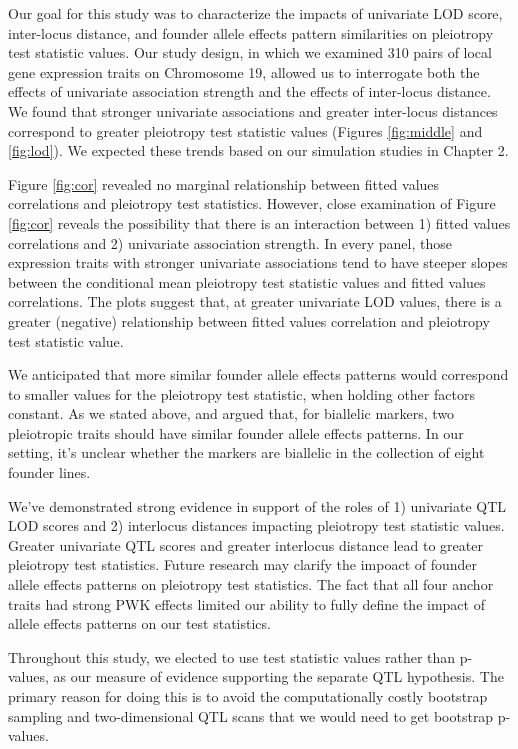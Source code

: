 \documentclass[oneside]{book}
\begin{document}
Our goal for this study was to characterize the impacts of univariate LOD score, inter-locus distance, and founder allele effects pattern similarities on pleiotropy test statistic values. Our study design, in which we examined 310 pairs of local gene expression traits on Chromosome 19, allowed us to interrogate both the effects of univariate association strength and the effects of inter-locus distance. We found that stronger univariate associations and greater inter-locus distances correspond to greater pleiotropy test statistic values (Figures \ref{fig:middle} and \ref{fig:lod}). We expected these trends based on our simulation studies in Chapter 2.

Figure \ref{fig:cor} revealed no marginal relationship between fitted values correlations and pleiotropy test statistics. However, close examination of Figure \ref{fig:cor} reveals the possibility that there is an interaction between 1) fitted values correlations and 2) univariate association strength. In every panel, those expression traits with stronger univariate associations tend to have steeper slopes between the conditional mean pleiotropy test statistic values and fitted values correlations. The plots suggest that, at greater univariate LOD values, there is a greater (negative) relationship between fitted values correlation and pleiotropy test statistic value.

We anticipated that more similar founder allele effects patterns would correspond to smaller values for the pleiotropy test statistic, when holding other factors constant. As we stated above, \citet{macdonald2007joint} and \citet{king2012genetic} argued that, for biallelic markers, two pleiotropic traits should have similar founder allele effects patterns. In our setting, it's unclear whether the markers are biallelic in the collection of eight founder lines.

We've demonstrated strong evidence in support of the roles of 1) univariate QTL LOD scores and 2) interlocus distances impacting pleiotropy test statistic values. Greater univariate QTL scores and greater interlocus distance lead to greater pleiotropy test statistics. Future research may clarify the impoact of founder allele effects patterns on pleiotropy test statistics. The fact that all four anchor traits had strong PWK effects limited our ability to fully define the impact of allele effects patterns on our test statistics.

Throughout this study, we elected to use test statistic values rather than p-values, as our measure of evidence supporting the separate QTL hypothesis. The primary reason for doing this is to avoid the computationally costly bootstrap sampling and two-dimensional QTL scans that we would need to get bootstrap p-values.
\end{document}

